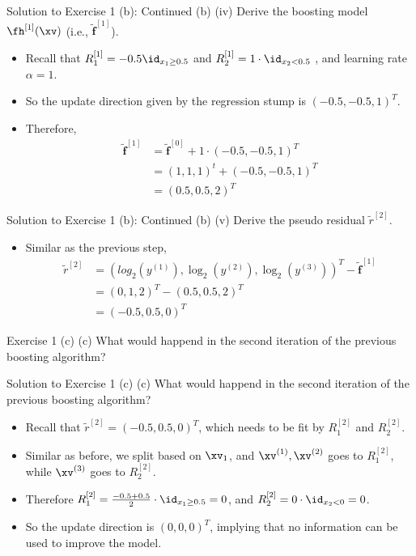 \documentclass[aspectratio=169]{beamer}
\newcommand{\fhx}[1]{\fh^{[#1]}(\xv)}
\newcommand{\rtilde}[1]{\tilde{r}^{[#1]}}
\newcommand{\fhv}[1]{\tilde{\bm{f}}^{[#1]}}
\begin{document}
\begin{frame}{Solution to Exercise 1 (b): Continued}
	(b) (iv) Derive the boosting model $\fhx{1}$ (i.e., $\fhv{1}$).
	\begin{itemize}
		\item<2-> Recall that $R_1^{[1]} = - 0.5 \id_{x_1 \geq 0.5}$ and $R_2^{[1]} = 1 \cdot \id_{x_2 < 0.5}$ , and learning rate $\alpha = 1$.
		\item<3-> So the update direction given by the regression stump is $(-0.5, -0.5, 1)^T$.
		\item<4-> Therefore, 
			\begin{align*}
				\fhv{1} &= \fhv{0} + 1 \cdot (- 0.5, - 0.5, 1)^T \\
				&= (1, 1, 1)^t + (-0.5, -0.5, 1)^T \\
				&= (0.5, 0.5, 2)^T
			\end{align*}
	\end{itemize}
\end{frame}

\begin{frame}{Solution to Exercise 1 (b): Continued}
	(b) (v) Derive the pseudo residual $\rtilde{2}$.
	\begin{itemize}
		\item Similar as the previous step, 
			\begin{align*}
				\rtilde{2} & = \left(log_2(y^{(1)}), \log_2(y^{(2)}), \log_2 (y^{(3)}) \right)^T - \fhv{1} \\
				&= (0, 1, 2)^T - (0.5, 0.5, 2)^T \\
				&= (-0.5, 0.5, 0)^T
			\end{align*}
	\end{itemize}
\end{frame}

\begin{frame}{Exercise 1 (c)}
	(c) What would happend in the second iteration of the previous boosting algorithm?
\end{frame}

\begin{frame}{Solution to Exercise 1 (c)}
	(c) What would happend in the second iteration of the previous boosting algorithm?

	\vspace{10pt}
	\begin{itemize}
		\item<2-> Recall that $\rtilde{2} = (-0.5, 0.5, 0)^T$, which needs to be fit by $R_1^{[2]}$ and $R_2^{[2]}$. 
		\item<3-> Similar as before, we split based on $\xv_1$, and $\xv^{(1)}, \xv^{(2)}$ goes to $R_1^{[2]}$, while $\xv^{(3)}$ goes to $R_2^{[2]}$.
		\item<4-> Therefore $R_1^{[2]} = \frac{-0.5 + 0.5}{2} \cdot \id_{x_1 \geq 0.5} = 0$, and $R_2^{[2]} = 0 \cdot \id_{x_2 < 0} = 0$.
		\item<5-> So the update direction is $(0, 0, 0)^T$, implying that no information can be used to improve the model.
	\end{itemize}
\end{frame}
\end{document}
